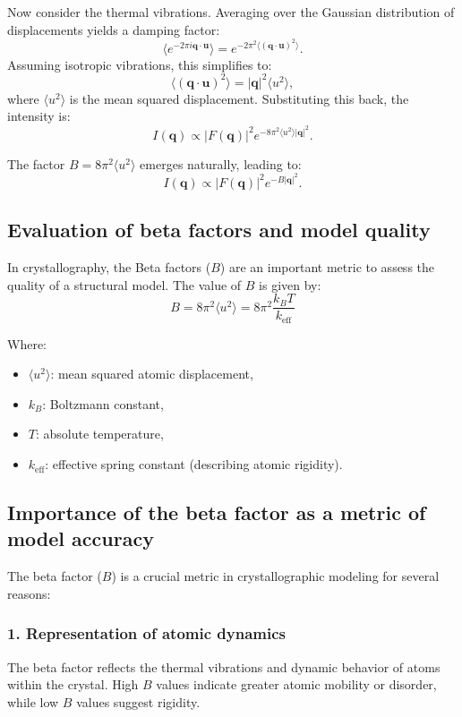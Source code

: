 \documentclass[English, Lau, oneside]{sapthesis}
\begin{document}
Now consider the thermal vibrations. Averaging over the Gaussian distribution of displacements yields a damping factor:
\[
\langle e^{-2\pi i \mathbf{q} \cdot \mathbf{u}} \rangle = e^{-2\pi^2 \langle (\mathbf{q} \cdot \mathbf{u})^2 \rangle}.
\]
Assuming isotropic vibrations, this simplifies to:
\[
\langle (\mathbf{q} \cdot \mathbf{u})^2 \rangle = |\mathbf{q}|^2 \langle u^2 \rangle,
\]
where $\langle u^2 \rangle$ is the mean squared displacement. Substituting this back, the intensity is:
\[
I(\mathbf{q}) \propto |F(\mathbf{q})|^2 e^{-8\pi^2 \langle u^2 \rangle |\mathbf{q}|^2}.
\]

The factor $B = 8\pi^2 \langle u^2 \rangle$ emerges naturally, leading to:
\[
I(\mathbf{q}) \propto |F(\mathbf{q})|^2 e^{-B |\mathbf{q}|^2}.
\]

\subsection{Evaluation of beta factors and model quality}
\noindent In crystallography, the Beta factors (\(B\)) are an important metric to assess the quality of a structural model. The value of \(B\) is given by:
\begin{equation}
    B = 8\pi^2 \langle u^2 \rangle = 8\pi^2 \frac{k_B T}{k_{\text{eff}}} \label{Kirchhoff}
\end{equation}

Where:
\begin{itemize}
    \item \(\langle u^2 \rangle\): mean squared atomic displacement,
    \item \(k_B\): Boltzmann constant,
    \item \(T\): absolute temperature,
    \item \(k_{\text{eff}}\): effective spring constant (describing atomic rigidity).
\end{itemize}


\subsection{Importance of the beta factor as a metric of model accuracy}
\noindent The beta factor ($B$) is a crucial metric in crystallographic modeling for several reasons:

\subsubsection{1. Representation of atomic dynamics}
The beta factor reflects the thermal vibrations and dynamic behavior of atoms within the crystal. High $B$ values indicate greater atomic mobility or disorder, while low $B$ values suggest rigidity.
\end{document}

